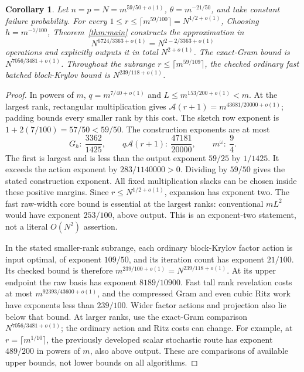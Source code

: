 \documentclass[11pt]{article}
\newtheorem{corollary}[theorem]{Corollary}
\newcommand{\Ac}{\mathcal A}
\begin{document}
\begin{corollary}\label{cor:example}
Let \(n=p=N=m^{59/50+o(1)}\), \(\theta=m^{-21/50}\), and take
constant failure probability. For every
\(1\leq r\leq\lceil m^{59/100}\rceil=N^{1/2+o(1)}\),
Choosing \(h=m^{-7/100}\), Theorem~\ref{thm:main} constructs the
approximation in
\[
 N^{6724/3363+o(1)}=N^{2-2/3363+o(1)}
\]
operations and explicitly outputs it in total \(N^{2+o(1)}\).
The exact-Gram bound is \(N^{7056/3481+o(1)}\).
Throughout the subrange \(r\leq\lceil m^{59/109}\rceil\), the checked
ordinary fast batched block-Krylov bound is \(N^{239/118+o(1)}\).
\end{corollary}
\begin{proof}
In powers of \(m\), \(q=m^{7/40+o(1)}\) and
\(L\leq m^{153/200+o(1)}<m\). At the largest rank, rectangular
multiplication gives \(\Ac(r+1)=m^{43681/20000+o(1)}\); padding
bounds every smaller rank by this cost. The sketch row exponent is
\(1+2(7/100)=57/50<59/50\). The construction exponents are at most
\[
 G_h:\ \frac{3362}{1425},\qquad
 q\Ac(r+1):\ \frac{47181}{20000},\qquad
 m^\omega:\ \frac94.
\]
The first is largest and is less than the output exponent \(59/25\)
by \(1/1425\). It exceeds the action exponent by \(283/1140000>0\).
Dividing by \(59/50\) gives the stated construction exponent. All fixed
multiplication slacks can be chosen inside these positive margins.
Since \(r\leq N^{1/2+o(1)}\), expansion has exponent two.
The fast raw-width core bound is essential at the largest ranks:
conventional \(mL^2\) would have exponent \(253/100\), above output.
This is an exponent-two statement, not a literal \(O(N^2)\) assertion.

In the stated smaller-rank subrange, each ordinary block-Krylov factor
action is input optimal, of exponent \(109/50\), and its iteration count has
exponent \(21/100\). Its checked bound is therefore
\(m^{239/100+o(1)}=N^{239/118+o(1)}\). At its upper endpoint the
raw basis has exponent \(8189/10900\). Fast tall rank revelation costs
at most \(m^{92393/43600+o(1)}\), and the compressed Gram and even cubic
Ritz work have exponents less than \(239/100\). Wider factor actions
and projection also lie below that bound. At larger ranks, use the
exact-Gram comparison \(N^{7056/3481+o(1)}\); the ordinary action and
Ritz costs can change. For example, at \(r=\lceil m^{1/10}\rceil\),
the previously developed scalar stochastic route has exponent \(489/200\)
in powers of \(m\), also above output. These are comparisons of
available upper bounds, not lower bounds on all algorithms.
\end{proof}
\end{document}
